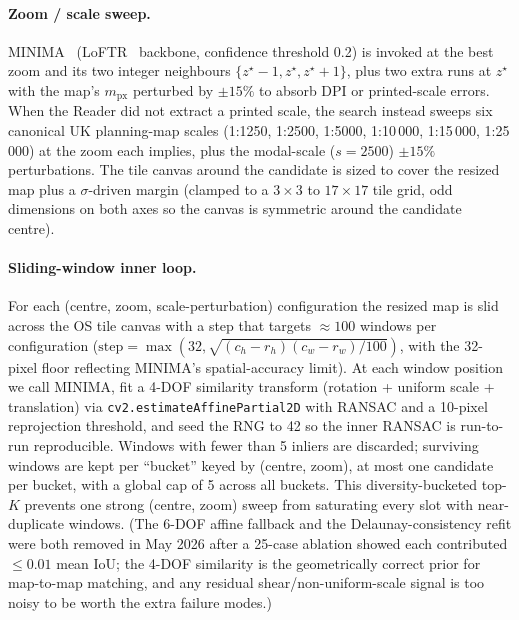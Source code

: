 \documentclass[11pt]{article}
\begin{document}
\paragraph{Zoom / scale sweep.}
MINIMA~\cite{ren2025minima} (LoFTR~\cite{Sun_2021_CVPR} backbone, confidence threshold 0.2) is invoked at the best zoom and its two integer neighbours $\{z^{\star}-1, z^{\star}, z^{\star}+1\}$, plus two extra runs at $z^{\star}$ with the map's $m_{\text{px}}$ perturbed by $\pm15\%$ to absorb DPI or printed-scale errors. When the Reader did not extract a printed scale, the search instead sweeps six canonical UK planning-map scales (1:1250, 1:2500, 1:5000, 1:10\,000, 1:15\,000, 1:25\,000) at the zoom each implies, plus the modal-scale ($s=2500$) $\pm15\%$ perturbations. The tile canvas around the candidate is sized to cover the resized map plus a $\sigma$-driven margin (clamped to a $3{\times}3$ to $17{\times}17$ tile grid, odd dimensions on both axes so the canvas is symmetric around the candidate centre).

\paragraph{Sliding-window inner loop.}
For each (centre, zoom, scale-perturbation) configuration the resized map is slid across the OS tile canvas with a step that targets $\approx 100$ windows per configuration ($\mathrm{step} = \max(32, \sqrt{(c_h - r_h)(c_w - r_w) / 100})$, with the 32-pixel floor reflecting MINIMA's spatial-accuracy limit). At each window position we call MINIMA, fit a 4-DOF similarity transform (rotation + uniform scale + translation) via \texttt{cv2.estimateAffinePartial2D} with RANSAC and a 10-pixel reprojection threshold, and seed the RNG to 42 so the inner RANSAC is run-to-run reproducible. Windows with fewer than 5 inliers are discarded; surviving windows are kept per ``bucket'' keyed by (centre, zoom), at most one candidate per bucket, with a global cap of 5 across all buckets. This diversity-bucketed top-$K$ prevents one strong (centre, zoom) sweep from saturating every slot with near-duplicate windows. (The 6-DOF affine fallback and the Delaunay-consistency refit were both removed in May 2026 after a 25-case ablation showed each contributed $\leq 0.01$ mean IoU; the 4-DOF similarity is the geometrically correct prior for map-to-map matching, and any residual shear/non-uniform-scale signal is too noisy to be worth the extra failure modes.)
\end{document}

